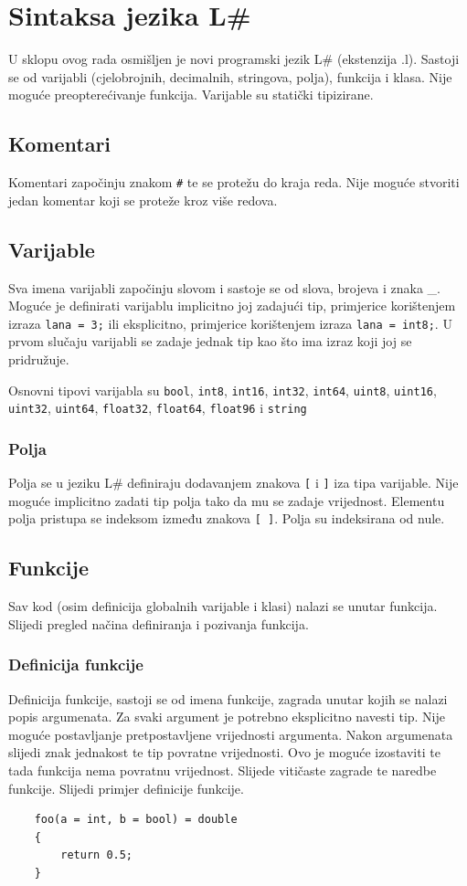 \documentclass[times, utf8, zavrsni]{fer}
\begin{document}
\chapter{Sintaksa jezika L\# }
U sklopu ovog rada osmišljen je novi programski jezik L\# (ekstenzija .l). Sastoji se od varijabli (cjelobrojnih, decimalnih, stringova, polja), 
funkcija i klasa. Nije moguće preopterećivanje funkcija. Varijable su statički tipizirane.

\section{Komentari}
Komentari započinju znakom \verb|#| te se protežu do kraja reda. Nije moguće 
stvoriti jedan komentar koji se proteže kroz više redova.

\section{Varijable}
Sva imena varijabli započinju slovom i sastoje se od slova, brojeva i znaka \_. Moguće je definirati varijablu implicitno joj zadajući tip, primjerice korištenjem
izraza \verb|lana = 3;| ili eksplicitno, primjerice korištenjem izraza \verb|lana = int8;|. U prvom slučaju varijabli se zadaje jednak tip kao što ima izraz
koji joj se pridružuje.

Osnovni tipovi varijabla su \verb|bool|, 
\verb|int8|,  \verb|int16|,  \verb|int32|,  \verb|int64|, 
\verb|uint8|, \linebreak  \verb|uint16|,  \verb|uint32|,  \verb|uint64|, 
\verb|float32|,  \verb|float64|,  \verb|float96| i \verb|string|

\subsection{Polja}
Polja se u jeziku L\# definiraju dodavanjem znakova \verb|[| i \verb|]| iza tipa varijable. Nije moguće implicitno zadati tip polja tako da mu se zadaje vrijednost.
Elementu polja pristupa se indeksom između znakova \verb|[ ]|. Polja su indeksirana od nule.

\section{Funkcije}
Sav kod (osim definicija globalnih varijable i klasi) nalazi se unutar funkcija. Slijedi pregled načina definiranja i pozivanja funkcija.
\subsection{Definicija funkcije}
Definicija funkcije, sastoji se od imena funkcije, zagrada unutar kojih se nalazi popis argumenata. Za svaki argument je potrebno eksplicitno navesti tip. Nije moguće 
postavljanje pretpostavljene vrijednosti argumenta. Nakon argumenata slijedi znak jednakost te tip povratne vrijednosti. Ovo je moguće izostaviti te tada funkcija nema 
povratnu vrijednost. Slijede vitičaste zagrade te naredbe funkcije. Slijedi primjer definicije funkcije.
\begin{verbatim}
    foo(a = int, b = bool) = double
    {
        return 0.5;
    }
\end{verbatim}
\end{document}
